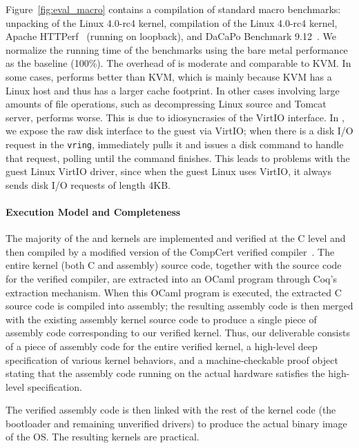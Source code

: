 Figure~\ref{fig:eval_macro} contains a compilation of standard macro
benchmarks: unpacking of the Linux 4.0-rc4 kernel, compilation of the
Linux 4.0-rc4 kernel, Apache HTTPerf~\cite{mosberger1998} (running on
loopback), and DaCaPo Benchmark 9.12~\cite{dacapo2006}.
We normalize the running time of the benchmarks
using the bare metal performance as the baseline (100\%). The overhead of
\cCTOS{} is moderate and comparable to KVM. In some cases, \cCTOS{}
performs better than KVM, which is mainly because KVM has a Linux host and thus has a
larger cache footprint. In other cases involving large amounts of file
operations, such as decompressing Linux source and Tomcat server, \cCTOS{}
performs worse. This is due to idiosyncrasies of the VirtIO interface. In
\cCTOS{}, we expose the raw disk interface to the guest via VirtIO; when
there is a disk I/O request in the \texttt{vring}, \cCTOS{} immediately
pulls it and issues a disk command to handle that request, polling until the
command finishes. This leads to problems with the guest Linux VirtIO driver, since
when the guest Linux uses VirtIO, it always sends disk I/O requests of length
4KB.








\paragraph{Execution Model and Completeness}
The majority of the {\mCTOS} and \cCTOS{} kernels are implemented and verified 
at the C level and then compiled by a modified version of the CompCert verified
compiler~\cite{dscal15}.  The entire kernel (both C and assembly)
source code, together with the source code for the verified compiler,
are extracted into an OCaml program through Coq's extraction
mechanism. When this OCaml program is executed, the extracted C source code 
is compiled into assembly; the resulting assembly code is then merged 
with the existing assembly kernel source code to produce a single piece 
of assembly code corresponding to our verified kernel.  Thus, our deliverable 
consists of a piece of assembly code for the entire verified kernel, a 
high-level deep specification of various kernel behaviors, and a 
machine-checkable proof object stating that the assembly code running on 
the actual hardware satisfies the high-level specification.

The verified assembly code is then linked with the rest of the kernel code
(the bootloader and remaining unverified drivers) to produce the
actual binary image of the OS. The resulting kernels are practical.

